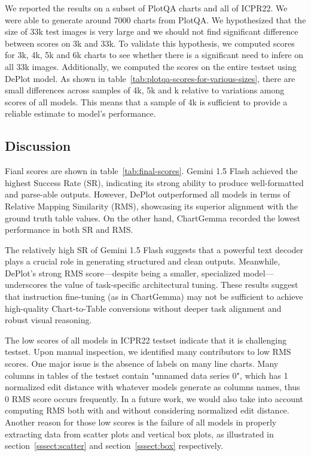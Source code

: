 \documentclass[
	letterpaper, %
]{jdf}
\begin{document}
We reported the results on a subset of PlotQA charts and all of ICPR22.
We were able to generate around 7000 charts from PlotQA.
We hypothesized that the size of 33k test images is very large and we should not find significant difference between scores on 3k and 33k.
To validate this hypothesis, we computed scores for 3k, 4k, 5k and 6k charts to see whether there is a significant need to infere on all 33k images.
Additionally, we computed the scores on the entire testset using DePlot model.
As shown in table~\ref{tab:plotqa-scores-for-various-sizes}, there are small differences across samples of 4k, 5k and k relative to variations among scores of all models.
This means that a sample of 4k is sufficient to provide a reliable estimate to model's performance.


\subsection{Discussion}\label{ssect:discussion}

Fianl scores are shown in table~\ref{tab:final-scores}.
Gemini 1.5 Flash achieved the highest Success Rate (SR), indicating its strong ability to produce well-formatted and parse-able outputs.
However, DePlot outperformed all models in terms of Relative Mapping Similarity (RMS), showcasing its superior alignment with the ground truth table values.
On the other hand, ChartGemma recorded the lowest performance in both SR and RMS.

The relatively high SR of Gemini 1.5 Flash suggests that a powerful text decoder plays a crucial role in generating structured and clean outputs.
Meanwhile, DePlot’s strong RMS score—despite being a smaller, specialized model—underscores the value of task-specific architectural tuning.
These results suggest that instruction fine-tuning (as in ChartGemma) may not be sufficient to achieve high-quality Chart-to-Table conversions without deeper task alignment and robust visual reasoning.

The low scores of all models in ICPR22 testset indicate that it is challenging testset.
Upon manual inspection, we identified many contributors to low RMS scores.
One major issue is the absence of labels on many line charts.
Many columns in tables of the testset contain "unnamed data series 0", which has 1 normalized edit distance with whatever models generate as columns names, thus 0 RMS score occurs frequently.
In a future work, we would also take into account computing RMS both with and without considering normalized edit distance.
Another reason for those low scores is the failure of all models in properly extracting data from scatter plots and vertical box plots, as illustrated in section~\ref{sssect:scatter} and section~\ref{sssect:box} respectively.
\end{document}
